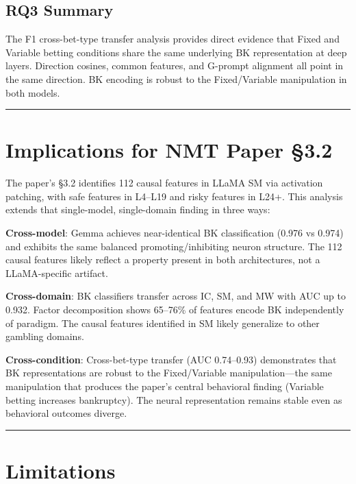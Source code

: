 \documentclass[11pt,a4paper]{article}
\begin{document}
\subsection{RQ3 Summary}

The F1 cross-bet-type transfer analysis provides direct evidence that Fixed and Variable betting conditions share the same underlying BK representation at deep layers. Direction cosines, common features, and G-prompt alignment all point in the same direction. BK encoding is robust to the Fixed/Variable manipulation in both models.

\bigskip\hrule\bigskip

\section{Implications for NMT Paper \S3.2}

The paper's \S3.2 identifies 112 causal features in LLaMA SM via activation patching, with safe features in L4--L19 and risky features in L24+. This analysis extends that single-model, single-domain finding in three ways:

\textbf{Cross-model}: Gemma achieves near-identical BK classification (0.976 vs 0.974) and exhibits the same balanced promoting/inhibiting neuron structure. The 112 causal features likely reflect a property present in both architectures, not a LLaMA-specific artifact.

\textbf{Cross-domain}: BK classifiers transfer across IC, SM, and MW with AUC up to 0.932. Factor decomposition shows 65--76\% of features encode BK independently of paradigm. The causal features identified in SM likely generalize to other gambling domains.

\textbf{Cross-condition}: Cross-bet-type transfer (AUC 0.74--0.93) demonstrates that BK representations are robust to the Fixed/Variable manipulation---the same manipulation that produces the paper's central behavioral finding (Variable betting increases bankruptcy). The neural representation remains stable even as behavioral outcomes diverge.

\bigskip\hrule\bigskip

\section{Limitations}
\end{document}
